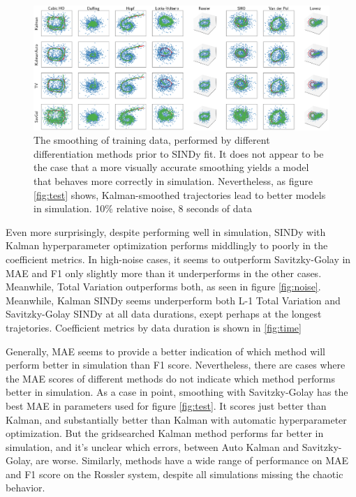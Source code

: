 \documentclass{ACCESS_latex_template_20231118/ieeeaccess}
\begin{document}
\begin{figure}
    \label{fig:train}
    \includegraphics[width=\textwidth]{images/summary_train}
    \caption{The smoothing of training data, performed by different differentiation methods prior to SINDy fit.  It does not appear to be the case that a more visually accurate smoothing yields a model that behaves more correctly in simulation. Nevertheless, as figure \ref{fig:test} shows, Kalman-smoothed trajectories lead to better models in simulation.  10\% relative noise, 8 seconds of data}
\end{figure}

Even more surprisingly, despite performing well in simulation, SINDy with Kalman hyperparameter optimization performs middlingly to poorly in the coefficient metrics.  In high-noise cases, it seems to outperform Savitzky-Golay in MAE and F1 only slightly more than it underperforms in the other cases.  Meanwhile, Total Variation outperforms both, as seen in figure \ref{fig:noise}. Meanwhile, Kalman SINDy seems underperform both L-1 Total Variation and Savitzky-Golay SINDy at all data durations, exept perhaps at the longest trajetories.  Coefficient metrics by data duration is shown in \ref{fig:time}

Generally, MAE seems to provide a better indication of which method will perform better in simulation than F1 score.  Nevertheless, there are cases where the MAE scores of different methods do not indicate which method performs better in simulation.  As a case in point, smoothing with Savitzky-Golay has the best MAE in parameters used for figure \ref{fig:test}.  It scores just better than Kalman, and substantially better than Kalman with automatic hyperparameter optimization.  But the gridsearched Kalman method performs far better in simulation, and it's unclear which errors, between Auto Kalman and Savitzky-Golay, are worse.  Similarly, methods have a wide range of performance on MAE and F1 score on the Rossler system, despite all simulations missing the chaotic behavior.
\end{document}
